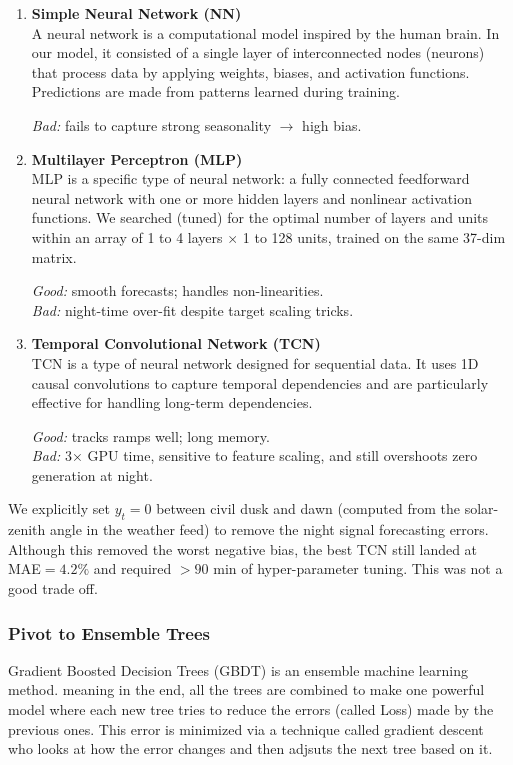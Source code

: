 \begin{enumerate}
  \item \textbf{Simple Neural Network (NN)}\\
        A neural network is a computational model inspired by the human brain. 
        In our model, it consisted of a single layer of interconnected nodes (neurons) 
        that process data by applying weights, biases, and activation functions.
        Predictions are made from patterns learned during training.

        \emph{Bad:} fails to capture strong seasonality $\rightarrow$ high bias.
  \item \textbf{Multilayer Perceptron (MLP)}\\
        MLP is a specific type of neural network: a fully connected feedforward neural 
        network with one or more hidden layers and nonlinear activation functions.
        We searched (tuned) for the optimal number of layers and units within an array of 1 
        to 4 layers $\times$ 1 to 128 units, trained on the same 37-dim matrix.

        \emph{Good:} smooth forecasts; handles non-linearities.\\
        \emph{Bad:} night-time over-fit despite target scaling tricks.
  \item \textbf{Temporal Convolutional Network (TCN)}\\
        TCN is a type of neural network designed for sequential data. It uses 1D causal 
        convolutions to capture temporal dependencies and are particularly effective for 
        handling long-term dependencies.

        \emph{Good:} tracks ramps well; long memory.\\
        \emph{Bad:} 3× GPU time, sensitive to feature scaling, and still
        overshoots zero generation at night.
\end{enumerate}


We explicitly set $y_t=0$ between civil dusk and dawn (computed from the
solar-zenith angle in the weather feed) to remove the night signal forecasting errors.
Although this removed the worst negative bias, the best TCN still landed at \textrm{MAE}$=4.2\%$ and required
$>\!90$ min of hyper-parameter tuning. This was not a good trade off.

\subsubsection*{Pivot to Ensemble Trees}  
Gradient Boosted Decision Trees (GBDT) is an ensemble machine learning method. meaning in the 
end, all the trees are combined to make one powerful model where each new tree tries to reduce 
the errors (called Loss) made by the previous ones. This error is minimized via a technique called
gradient descent who looks at how the error changes and then adjsuts the next tree based on it.

